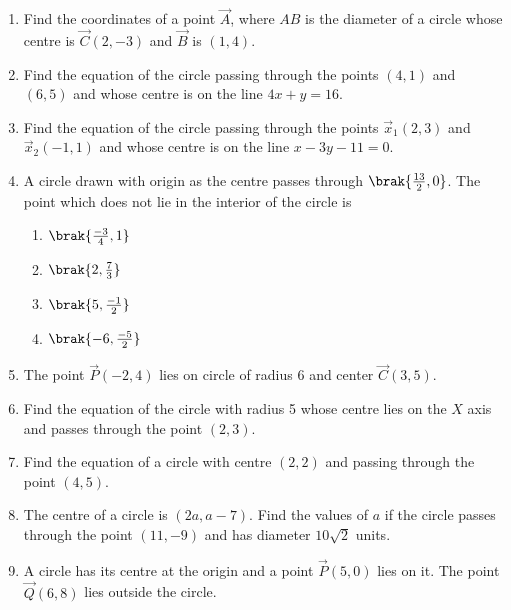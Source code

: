\begin{enumerate}[label=\thesubsection.\arabic*, ref=\thesubsection.\theenumi]
\item Find the coordinates of a point $\vec{A}$, where $AB$ is the diameter of a circle whose centre is $ \vec{C}(2,-3)$  and  $\vec{B}$ is $(1,4)$.
	\\
		\solution
	
  \item Find the equation of the circle passing through the points $(4, 1)$ and $(6, 5)$ and whose centre is on the line $ 4x+y=16. $
\label{chapters/11/11/1/10}
\\
\solution

  \item Find the equation of the circle passing through the points $\vec{x}_1(2, 3)$ and $\vec{x}_2(-1, 1)$ and whose centre is on the line $x-3y-11=0$.
\label{chapters/11/11/1/11}
\\
\solution 

\item A circle drawn with origin as the
centre passes through 
		$\brak{\frac{13}{2},  0}$. The
point which does not lie in the
interior of the circle is
\begin{enumerate}
\item $\brak{\frac{-3}{4},  1}$
\item $\brak{2,  \frac{7}{3}}$
\item $\brak{5,  \frac{-1}{2}}$
\item $\brak{-6,  \frac{-5}{2}}$
\end{enumerate}
 \item The point $\vec{P}(-2,  4)$ lies on circle of radius 6 and center $\vec{C}(3,  5)$.
  \item Find the equation of the circle with radius 5 whose centre lies on the $X$ axis and passes through the point $(2, 3)$.
\label{chapters/11/11/1/12}
\\
\solution 

  \item Find the equation of a circle with centre $(2, 2)$ and passing through the point $(4, 5)$.
\label{chapters/11/11/1/14}
\\
\solution

\item The centre of a circle is $(2a,  a-7)$. Find the values of $a$ if the circle passes through the point $(11,  -9)$ and has diameter $10\sqrt{2}$ units.
\item A circle has its centre at the origin and a point $\vec{P}(5,  0)$ lies on it. The point $\vec{Q}(6,  8)$ lies outside the circle.

\end{enumerate}
